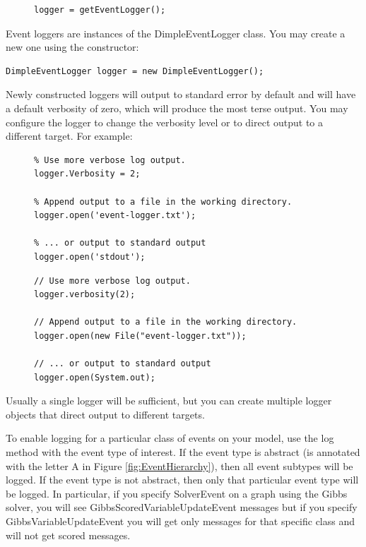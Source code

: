 \begin{figure}[H]
\begin{lstlisting}
logger = getEventLogger();
\end{lstlisting}
\end{figure}
\fi

\ifjava
Event loggers are instances of the DimpleEventLogger class. You may create a new one using the constructor:

\begin{lstlisting}
DimpleEventLogger logger = new DimpleEventLogger();
\end{lstlisting}
\fi

Newly constructed loggers will output to standard error by default and will have a default verbosity of zero, which will produce the most terse output. You may configure the logger to change the verbosity level or to direct output to a different target. For example:

\begin{figure}[H]
\ifmatlab
\begin{lstlisting}
% Use more verbose log output.
logger.Verbosity = 2;

% Append output to a file in the working directory.
logger.open('event-logger.txt');

% ... or output to standard output
logger.open('stdout');
\end{lstlisting}
\fi

\ifjava
\begin{lstlisting}
// Use more verbose log output.
logger.verbosity(2);

// Append output to a file in the working directory.
logger.open(new File("event-logger.txt"));

// ... or output to standard output
logger.open(System.out);
\end{lstlisting}
\fi
\end{figure}

Usually a single logger will be sufficient, but you can create multiple logger objects that direct output to different targets.

To enable logging for a particular class of events on your model, use the log method with the event type of interest. If the event type is abstract (is annotated with the letter A in Figure \ref{fig:EventHierarchy}), then
all event subtypes will be logged. If the event type is not abstract, then
only that particular event type will be logged. In particular, if you specify SolverEvent on a graph using the Gibbs solver, you will see
GibbsScoredVariableUpdateEvent messages but if you specify
GibbsVariableUpdateEvent you will get only messages for that specific
class and will not get scored messages.

